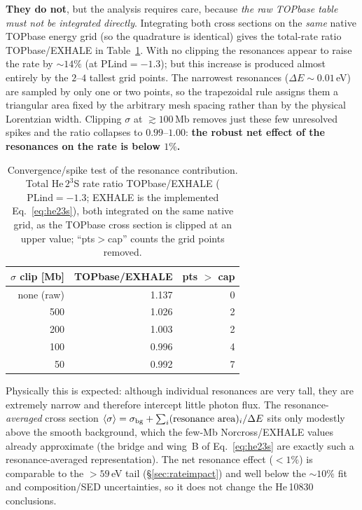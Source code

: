 \documentclass[english,a4paper]{my_memo}
\newcommand{\Mb}{\mathrm{Mb}}
\newcommand{\sig}{\sigma}
\begin{document}
\textbf{They do not}, but the analysis requires care, because
\emph{the raw TOPbase table must not be integrated directly}. Integrating
both cross sections on the \emph{same} native TOPbase energy grid (so the
quadrature is identical) gives the total-rate ratio TOPbase/EXHALE in
Table~\ref{tab:resonance}. With no clipping the resonances appear to raise
the rate by $\sim$$14\%$ (at $\mathrm{PLind}=-1.3$); but this increase is
produced almost entirely by the $2$--$4$ tallest grid points. The
narrowest resonances ($\Delta E\sim0.01\,$eV) are sampled by only one or
two points, so the trapezoidal rule assigns them a triangular area fixed
by the arbitrary mesh spacing rather than by the physical Lorentzian
width. Clipping $\sig$ at $\gtrsim100\,\Mb$ removes just these few
unresolved spikes and the ratio collapses to $0.99$--$1.00$: \textbf{the
robust net effect of the resonances on the rate is below $1\%$.}

\begin{table}[h]
\centering
\caption{Convergence/spike test of the resonance contribution. Total
He\,$2^3$S rate ratio TOPbase/EXHALE ($\mathrm{PLind}=-1.3$; EXHALE is the
implemented Eq.~\ref{eq:he23s}), both integrated on the same native grid, as
the TOPbase cross section is clipped at an upper value; ``pts$>$cap'' counts
the grid points removed.}
\label{tab:resonance}
\begin{tabular}{rrr}
\toprule
$\sig$ clip [Mb] & TOPbase/EXHALE & pts $>$ cap\\
\midrule
none (raw) & 1.137 & 0\\
500 & 1.026 & 2\\
200 & 1.003 & 2\\
100 & 0.996 & 4\\
50  & 0.992 & 7\\
\bottomrule
\end{tabular}
\end{table}

Physically this is expected: although individual resonances are very
tall, they are extremely narrow and therefore intercept little photon
flux. The resonance-\emph{averaged} cross section
$\langle\sig\rangle = \sig_{\rm bg} + \sum_i (\text{resonance area})_i/\Delta E$
sits only modestly above the smooth background, which the few-Mb
Norcross/EXHALE values already approximate (the bridge and wing~B of
Eq.~\ref{eq:he23s} are exactly such a resonance-averaged representation). The net resonance effect
($<1\%$) is comparable to the $>59\,$eV tail
(\S\ref{sec:rateimpact}) and well below the $\sim$$10\%$ fit and
composition/SED uncertainties, so it does not change the He\,10830
conclusions.
\end{document}
